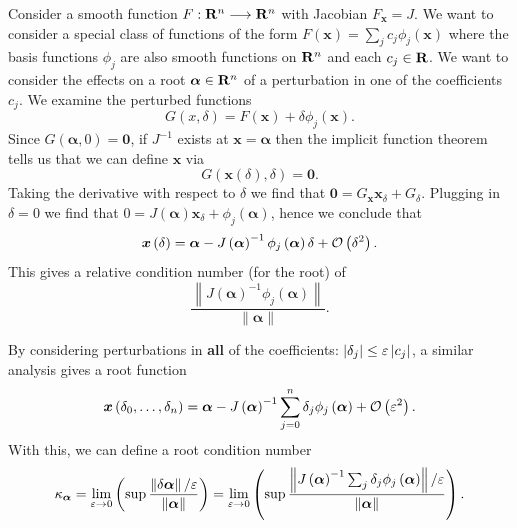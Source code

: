 Consider a smooth function \(F: \mathbf{R}^n \longrightarrow \mathbf{R}^n\)
with Jacobian \(F_{\bm{x}} = J\). We want to consider a special class of
functions of the form \(F\left(\bm{x}\right) = \sum_j c_j
\phi_j\left(\bm{x}\right)\) where the basis
functions \(\phi_j\) are also smooth functions on \(\mathbf{R}^n\)
and each \(c_j \in \mathbf{R}\). We want to consider the effects on a root
\(\bm{\alpha} \in \mathbf{R}^n\) of a perturbation in one of the
coefficients \(c_j\). We examine the perturbed functions
\begin{equation}
G(x, \delta) = F\left(\bm{x}\right) + \delta \phi_j\left(\bm{x}\right).
\end{equation}
Since \(G\left(\bm{\alpha}, 0\right) = \bm{0}\), if \(J^{-1}\) exists at
\(\bm{x} = \bm{\alpha}\) then
the implicit function theorem tells us that we can define
\(\bm{x}\) via
\begin{equation}
G\left(\bm{x}\left(\delta\right), \delta\right) = \bm{0}.
\end{equation}
Taking the derivative with respect to \(\delta\) we find that
\(\bm{0} = G_{\bm{x}} \bm{x}_{\delta} + G_{\delta}\). Plugging in
\(\delta = 0\) we find that \(0 = J\left(\bm{\alpha}\right) \bm{x}_{\delta} +
\phi_j\left(\bm{\alpha}\right)\), hence we
conclude that
\begin{equation}
\bm{x}\left(\delta\right) = \bm{\alpha} - J\left(\bm{\alpha}\right)^{-1}
  \phi_j\left(\bm{\alpha}\right) \delta + \mathcal{O}\left(\delta^2\right).
\end{equation}
This gives a relative condition number (for the root) of
\begin{equation}
\frac{\left \lVert J\left(\bm{\alpha}\right)^{-1}
  \phi_j\left(\bm{\alpha}\right) \right \rVert}{
  \left \lVert \bm{\alpha} \right \rVert}.
\end{equation}

By considering perturbations in \textbf{all} of the coefficients:
\(\left|\delta_j\right| \leq \varepsilon \left|c_j\right|\), a similar analysis
gives a root function
\begin{equation}
\bm{x}\left(\delta_0, \ldots, \delta_n\right) = \bm{\alpha} -
  J\left(\bm{\alpha}\right)^{-1} \sum_{j = 0}^n \delta_j
  \phi_j\left(\bm{\alpha}\right) + \mathcal{O}\left(\varepsilon^2\right).
\end{equation}
With this, we can define a root condition number
\begin{equation}\label{eq:abstract-cond-num}
\kappa_{\bm{\alpha}} =
  \lim_{\varepsilon \to 0} \left(\sup \frac{\left \lVert\delta \bm{\alpha}
  \right \rVert / \varepsilon}{\left \lVert\bm{\alpha}\right \rVert}\right) =
  \lim_{\varepsilon \to 0} \left(\sup \frac{\left \lVert
  J\left(\bm{\alpha}\right)^{-1} \sum_j \delta_j
  \phi_j\left(\bm{\alpha}\right) \right \rVert / \varepsilon}{
  \left \lVert\bm{\alpha}\right \rVert}\right).
\end{equation}

